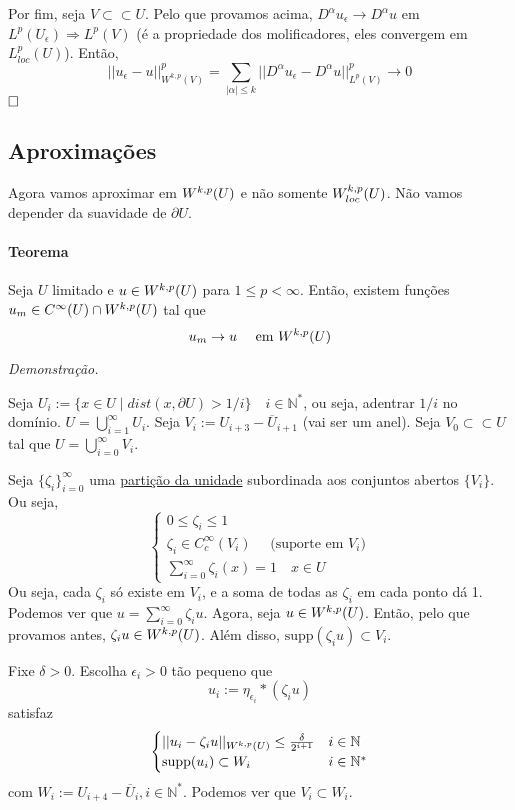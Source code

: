 \documentclass[a4paper, 11pt]{book}
\newcommand{\qed}{$\hfill\square$}
\newcommand{\N}{\mathbb{N}}
\newcommand{\pu}{\partial U}
\newcommand{\e}{\epsilon}
\begin{document}
Por fim, seja \( V \subset\subset U \). Pelo que provamos acima, \( D^\alpha u_\e \rightarrow D^\alpha u \) em \( L^p(U_\e) \Rightarrow L^p(V) \) (é a propriedade dos molificadores, eles convergem em \( L^p_{loc}(U) \)). Então, \[ ||u_\e - u||^p_{W^{k,p}(V)} = \sum_{|\alpha|\leq k} ||D^\alpha u_\e - D^\alpha u||^p_{L^p(V)} \rightarrow 0\] \qed

\subsection{Aproximações}

Agora vamos aproximar em \( W^{k,p}(U) \) e não somente \( W^{k,p}_{loc}(U)\). Não vamos depender da suavidade de \( \pu \).

\paragraph{Teorema} Seja \( U \) limitado e \( u \in W^{k,p}(U) \) para \( 1\leq p < \infty \). Então, existem funções \( u_m \in C^{\infty}(U) \cap W^{k,p}(U) \) tal que \[ u_m \rightarrow u \quad \text{ em }W^{k,p}(U) \]

\textit{Demonstração.}

Seja \( U_i := \{ x \in U \mid dist(x, \pu) > 1/i\} \quad i \in \N^*\), ou seja, adentrar \( 1/i \) no domínio. \( U = \bigcup_{i=1}^\infty U_i \). Seja \( V_i := U_{i+3} - \overline{U}_{i+1} \) (vai ser um anel). Seja \( V_0 \subset\subset U \) tal que \( U=\bigcup_{i=0}^{\infty}V_i \).

Seja \( \{\zeta_i\}_{i=0}^{\infty} \) uma \href{https://en.wikipedia.org/wiki/Partition_of_unity}{partição da unidade} subordinada aos conjuntos abertos \( \{V_i\} \). Ou seja, \[ \begin{cases}
	0 \leq \zeta_i \leq 1 \\
	\zeta_i \in C^\infty_c(V_i)\quad  \text{ (suporte em } V_i \text{)}\\
	\sum_{i=0}^{\infty} \zeta_i(x) = 1 \quad x \in U
\end{cases} \] Ou seja, cada \( \zeta_i \) só existe em \( V_i \), e a soma de todas as \( \zeta_i \) em cada ponto dá 1. Podemos ver que \( u=\sum_{i=0}^{\infty}\zeta_iu \). Agora, seja \( u \in W^{k,p}(U) \). Então, pelo que provamos antes, \( \zeta_iu \in W^{k,p}(U) \). Além disso, \( \text{supp}(\zeta_i u) \subset V_i \).

Fixe \( \delta>0\). Escolha \( \e_i>0 \) tão pequeno que \[ u_i := \eta_{\e_i} * \left(\zeta_iu\right) \] satisfaz \[ \begin{cases}
	||u_i - \zeta_iu||_{\sobolevdef} \leq \frac{\delta}{2^{i+1}} & i \in \N \\
	\text{supp}(u_i) \subset W_i & i \in \N^*
\end{cases} \] com \( W_i := U_{i+4} - \overline{U}_i, i \in \N^* \). Podemos ver que \( V_i \subset W_i \). 
\end{document}
